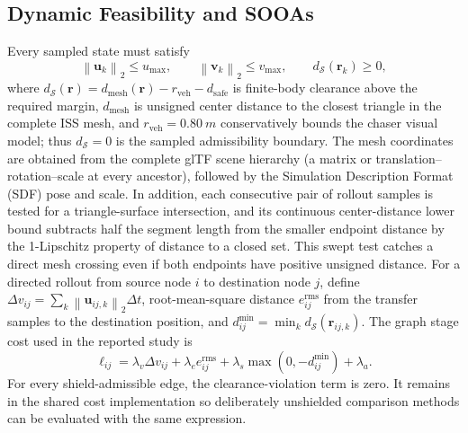 \documentclass{IEEEtaes}
\newcommand{\dt}{\Delta t}
\newcommand{\norm}[1]{\left\lVert #1 \right\rVert}
\newcommand{\unit}[2]{#1~#2}
\theoremstyle{remark}
\theoremstyle{plain}
\begin{document}
\subsection{Dynamic Feasibility and SOOAs}

Every sampled state must satisfy
\begin{equation}
  \norm{\mathbf u_k}_2\le u_{\max},\qquad
  \norm{\mathbf v_k}_2\le v_{\max},\qquad
  d_{\mathcal S}(\mathbf r_k)\ge 0,
  \label{eq:limits}
\end{equation}
where $d_{\mathcal S}(\mathbf r)=d_{\mathrm{mesh}}(\mathbf r)-r_{\mathrm{veh}}-d_{\mathrm{safe}}$ is finite-body clearance above the required margin, $d_{\mathrm{mesh}}$ is unsigned center distance to the closest triangle in the complete ISS mesh, and $r_{\mathrm{veh}}=\unit{0.80}{m}$ conservatively bounds the chaser visual model; thus $d_{\mathcal S}=0$ is the sampled admissibility boundary. The mesh coordinates are obtained from the complete glTF scene hierarchy (a matrix or translation--rotation--scale at every ancestor), followed by the Simulation Description Format (SDF) pose and scale. In addition, each consecutive pair of rollout samples is tested for a triangle-surface intersection, and its continuous center-distance lower bound subtracts half the segment length from the smaller endpoint distance by the 1-Lipschitz property of distance to a closed set. This swept test catches a direct mesh crossing even if both endpoints have positive unsigned distance. For a directed rollout from source node $i$ to destination node $j$, define $\Delta v_{ij}=\sum_k\norm{\mathbf u_{ij,k}}_2\dt$, root-mean-square distance $e_{ij}^{\mathrm{rms}}$ from the transfer samples to the destination position, and $d_{ij}^{\min}=\min_k d_{\mathcal S}(\mathbf r_{ij,k})$. The graph stage cost used in the reported study is
\begin{equation}
  \ell_{ij}=\lambda_v\Delta v_{ij}+\lambda_e e_{ij}^{\mathrm{rms}}+\lambda_s\max(0,-d_{ij}^{\min})+\lambda_a.
  \label{eq:edge-cost}
\end{equation}
For every shield-admissible edge, the clearance-violation term is zero. It remains in the shared cost implementation so deliberately unshielded comparison methods can be evaluated with the same expression.
\end{document}
